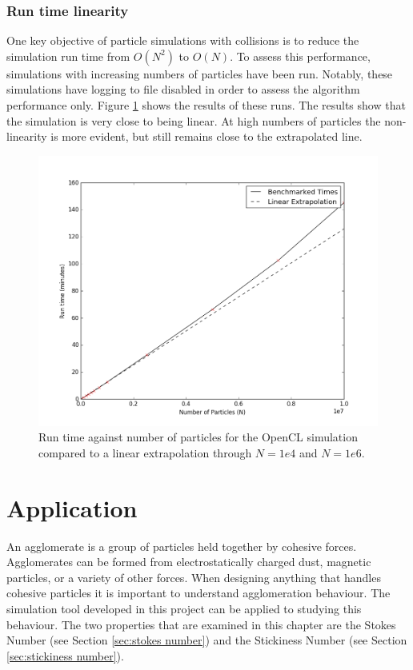 \documentclass[a4paper,11pt,titlepage]{report}
\begin{document}
\subsection{Run time linearity}
One key objective of particle simulations with collisions is to reduce the simulation run time from $O(N^2)$ to $O(N)$. To assess this performance, simulations with increasing numbers of particles have been run. Notably, these simulations have logging to file disabled in order to assess the algorithm performance only. Figure \ref{fig:opencl_performance} shows the results of these runs. The results show that the simulation is very close to being linear. At high numbers of particles the non-linearity is more evident, but still remains close to the extrapolated line.
\begin{figure}[!htb]
\centering
\includegraphics[scale=0.6]{figures/opencl_performance.png}
\caption{Run time against number of particles for the OpenCL simulation compared to a linear extrapolation through $N=1e4$ and $N=1e6$.}
\label{fig:opencl_performance}
\end{figure}
\chapter{Application}
\label{ch:Application}
An agglomerate is a group of particles held together by cohesive forces. Agglomerates can be formed from electrostatically charged dust, magnetic particles, or a variety of other forces. When designing anything that handles cohesive particles it is important to understand agglomeration behaviour. The simulation tool developed in this project can be applied to studying this behaviour. The two properties that are examined in this chapter are the Stokes Number (see Section \ref{sec:stokes number}) and the Stickiness Number (see Section \ref{sec:stickiness number}).
\end{document}
